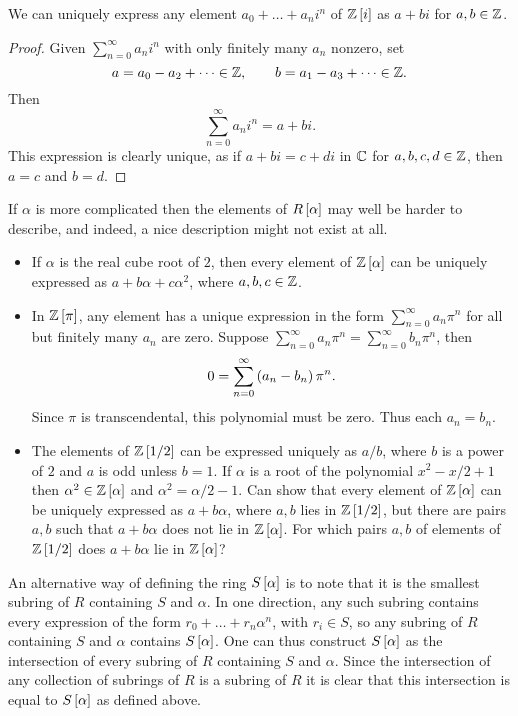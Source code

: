 \begin{proposition}
We can uniquely express any element $ a_0 + \dots + a_ni^n $ of $ \Z\sb{i} $ as $ a + bi $ for $ a, b \in \Z $.
\end{proposition}

\begin{proof}
Given $ \sum_{n = 0}^\infty a_ni^n $ with only finitely many $ a_n $ nonzero, set
$$ a = a_0 - a_2 + \dots \in \Z, \qquad b = a_1 - a_3 + \dots \in \Z. $$
Then
$$ \sum_{n = 0}^\infty a_ni^n = a + bi. $$
This expression is clearly unique, as if $ a + bi = c + di $ in $ \C $ for $ a, b, c, d \in \Z $, then $ a = c $ and $ b = d $.
\end{proof}

If $ \alpha $ is more complicated then the elements of $ R\sb{\alpha} $ may well be harder to describe, and indeed, a nice description might not exist at all.

\begin{example2}
\hfill
\begin{itemize}
\item If $ \alpha $ is the real cube root of $ 2 $, then every element of $ \Z\sb{\alpha} $ can be uniquely expressed as $ a + b\alpha + c\alpha^2 $, where $ a, b, c \in \Z $.
\item In $ \Z\sb{\pi} $, any element has a unique expression in the form $ \sum_{n = 0}^\infty a_n\pi^n $ for all but finitely many $ a_n $ are zero. Suppose $ \sum_{n = 0}^\infty a_n\pi^n = \sum_{n = 0}^\infty b_n\pi^n $, then
$$ 0 = \sum_{n = 0}^\infty \rb{a_n - b_n}\pi^n. $$
Since $ \pi $ is transcendental, this polynomial must be zero. Thus each $ a_n = b_n $.
\item The elements of $ \Z\sb{1 / 2} $ can be expressed uniquely as $ a / b $, where $ b $ is a power of $ 2 $ and $ a $ is odd unless $ b = 1 $. If $ \alpha $ is a root of the polynomial $ x^2 - x / 2 + 1 $ then $ \alpha^2 \in \Z\sb{\alpha} $ and $ \alpha^2 = \alpha / 2 - 1 $. Can show that every element of $ \Z\sb{\alpha} $ can be uniquely expressed as $ a + b\alpha $, where $ a, b $ lies in $ \Z\sb{1 / 2} $, but there are pairs $ a, b $ such that $ a + b\alpha $ does not lie in $ \Z\sb{\alpha} $. For which pairs $ a, b $ of elements of $ \Z\sb{1 / 2} $ does $ a + b\alpha $ lie in $ \Z\sb{\alpha} $?
\end{itemize}
\end{example2}

An alternative way of defining the ring $ S\sb{\alpha} $ is to note that it is the smallest subring of $ R $ containing $ S $ and $ \alpha $. In one direction, any such subring contains every expression of the form $ r_0 + \dots + r_n\alpha^n $, with $ r_i \in S $, so any subring of $ R $ containing $ S $ and $ \alpha $ contains $ S\sb{\alpha} $. One can thus construct $ S\sb{\alpha} $ as the intersection of every subring of $ R $ containing $ S $ and $ \alpha $. Since the intersection of any collection of subrings of $ R $ is a subring of $ R $ it is clear that this intersection is equal to $ S\sb{\alpha} $ as defined above.


